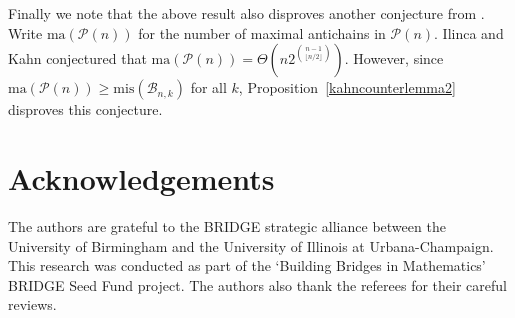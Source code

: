 \documentclass[11pt]{article}
\numberwithin{equation}{section}
\def\B{\mathcal{B}}
\def\P{\mathcal{P}}
\def\mis{\text{mis}}
\begin{document}
Finally we note that the above result also disproves another conjecture from \cite{IK}.  Write $\text{ma}(\P(n))$ for the number of maximal antichains in $\P(n)$. Ilinca and Kahn \cite{IK} conjectured that $\text{ma}(\P(n))=\Theta \left(n2^{\binom{n-1}{\lfloor n/2 \rfloor}}\right)$. However, since $\text{ma}(\P(n))\geq \mis(\B_{n,k})$ for all $k$, Proposition~\ref{kahncounterlemma2} disproves this conjecture.



\section*{Acknowledgements}
The authors are grateful to the BRIDGE strategic alliance between the University of Birmingham and the University of Illinois at Urbana-Champaign. This research was conducted as part of the `Building Bridges in Mathematics' BRIDGE Seed Fund project. The authors also thank the referees for their careful reviews.
\end{document}
